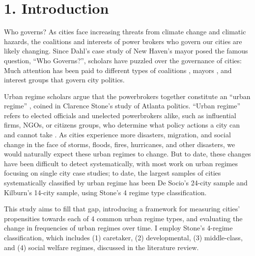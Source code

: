\documentclass[preprint, 3p,
authoryear]{elsarticle} %
\begin{document}
\hypertarget{introduction}{%
\section{1. Introduction}\label{introduction}}

Who governs? As cities face increasing threats from climate change and
climatic hazards, the coalitions and interests of power brokers who
govern our cities are likely changing. Since Dahl's
\citeyearpar{dahl_1961} case study of New Haven's mayor posed the famous
question, ``Who Governs?'', scholars have puzzled over the governance of
cities: Much attention has been paid to different types of coalitions
\citep{munoz_and_henry_1986, stone_1989, stoker_and_mossberger_1994, gilliam_1996, davies_2017, russo_and_scarnato_2018},
mayors
\citep{ramirez_perez_et_al_2008, debenedictis_kessner_and_warshaw_2016, freier_and_thomasius_2016, einstein_and_glick_2018},
and interest groups
\citep{logan_and_rabrenovic_1990, mossberger_and_stoker_2001, cooper_et_al_2005, portney_and_berry_2016, anzia_2019}
that govern city politics.

Urban regime scholars argue that the powerbrokers together constitute an
``urban regime'' \citep{stone_1993}, coined in Clarence Stone's
\citeyearpar{stone_1989} study of Atlanta politics. ``Urban regime''
refers to elected officials and unelected powerbrokers alike, such as
influential firms, NGOs, or citizens groups, who determine what policy
actions a city can and cannot take \citep{mossberger_and_stoker_2001}.
As cities experience more disasters, migration, and social change in the
face of storms, floods, fires, hurricanes, and other disasters, we would
naturally expect these urban regimes to change. But to date, these
changes have been difficult to detect systematically, with most work on
urban regimes focusing on single city case studies; to date, the largest
samples of cities systematically classified by urban regime has been De
Socio's \citeyearpar{de_socio_2007} 24-city sample and Kilburn's
\citeyearpar{kilburn_2004} 14-city sample, using Stone's
\citeyearpar{stone_1993} 4 regime type classification.

This study aims to fill that gap, introducing a framework for measuring
cities' propensities towards each of 4 common urban regime types, and
evaluating the change in frequencies of urban regimes over time. I
employ Stone's \citeyearpar{stone_1993} 4-regime classification, which
includes (1) caretaker, (2) developmental, (3) middle-class, and (4)
social welfare regimes, discussed in the literature review.
\end{document}
